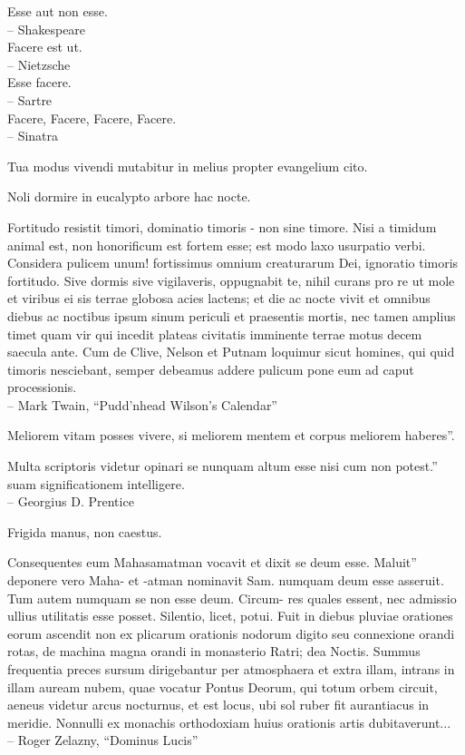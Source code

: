 \documentclass[titlepage,12pt]{memoir}
\begin{document}
Esse aut non esse.
\\-- Shakespeare
\\Facere est ut.
\\-- Nietzsche
\\Esse facere.
\\-- Sartre
\\Facere, Facere, Facere, Facere.
\\-- Sinatra

Tua modus vivendi mutabitur in melius propter evangelium cito.

Noli dormire in eucalypto arbore hac nocte.

Fortitudo resistit timori, dominatio timoris - non sine timore. Nisi a
timidum animal est, non honorificum est fortem esse; est modo
laxo usurpatio verbi. Considera pulicem unum!
fortissimus omnium creaturarum Dei, ignoratio timoris fortitudo.
Sive dormis sive vigilaveris, oppugnabit te, nihil curans pro re
ut mole et viribus ei sis terrae globosa acies
lactens; et die ac nocte vivit et omnibus diebus ac noctibus
ipsum sinum periculi et praesentis mortis, nec tamen amplius
timet quam vir qui incedit plateas civitatis imminente
terrae motus decem saecula ante. Cum de Clive, Nelson et Putnam loquimur
sicut homines, qui quid timoris nesciebant, semper debeamus addere pulicum
pone eum ad caput processionis.
\\-- Mark Twain, “Pudd’nhead Wilson’s Calendar”

Meliorem vitam posses vivere, si meliorem mentem et corpus meliorem haberes”.

Multa scriptoris videtur opinari se nunquam altum esse nisi cum non potest.”
suam significationem intelligere.
\\-- Georgius D. Prentice

Frigida manus, non caestus.

Consequentes eum Mahasamatman vocavit et dixit se deum esse. Maluit”
deponere vero Maha- et -atman nominavit Sam. numquam
deum esse asseruit. Tum autem numquam se non esse deum. Circum-
res quales essent, nec admissio ullius utilitatis esse posset.
Silentio, licet, potui. Fuit in diebus pluviae orationes eorum
ascendit non ex plicarum orationis nodorum digito seu connexione
orandi rotas, de machina magna orandi in monasterio Ratri;
dea Noctis. Summus frequentia preces sursum dirigebantur per
atmosphaera et extra illam, intrans in illam auream nubem, quae vocatur
Pontus Deorum, qui totum orbem circuit, aeneus videtur
arcus nocturnus, et est locus, ubi sol ruber fit aurantiacus in meridie.
Nonnulli ex monachis orthodoxiam huius orationis artis dubitaverunt...
\\-- Roger Zelazny, “Dominus Lucis”
\end{document}
